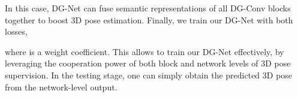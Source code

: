 \documentclass[journal]{IEEEtran}
\begin{document}
In this case,
DG-Net can fuse semantic representations of all DG-Conv blocks together to boost 3D pose estimation.
Finally,
we train our DG-Net with both losses,

where
 is a weight coefficient.
This allows to train our DG-Net effectively,
by leveraging the cooperation power of both block and network levels of 3D pose supervision.
In the testing stage,
one can simply obtain the predicted 3D pose from the network-level output.
\end{document}

